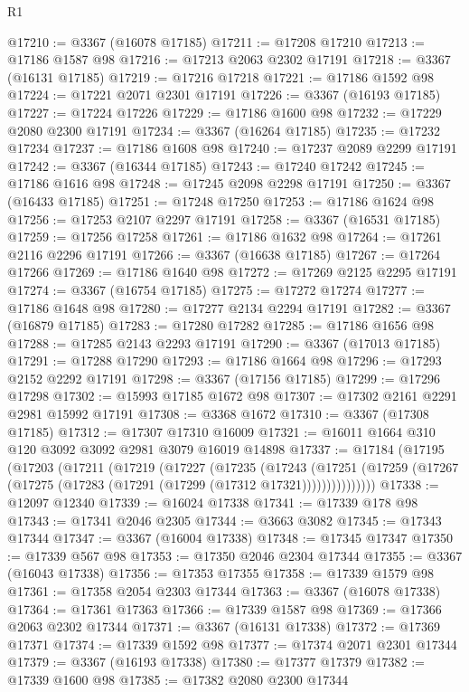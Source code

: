 \begin{lexlean}{R1}
\begin{coremodule}
@17210 := @3367 (@16078 @17185)
@17211 := @17208 @17210
@17213 := @17186 @1587 @98
@17216 := @17213 @2063 @2302 @17191
@17218 := @3367 (@16131 @17185)
@17219 := @17216 @17218
@17221 := @17186 @1592 @98
@17224 := @17221 @2071 @2301 @17191
@17226 := @3367 (@16193 @17185)
@17227 := @17224 @17226
@17229 := @17186 @1600 @98
@17232 := @17229 @2080 @2300 @17191
@17234 := @3367 (@16264 @17185)
@17235 := @17232 @17234
@17237 := @17186 @1608 @98
@17240 := @17237 @2089 @2299 @17191
@17242 := @3367 (@16344 @17185)
@17243 := @17240 @17242
@17245 := @17186 @1616 @98
@17248 := @17245 @2098 @2298 @17191
@17250 := @3367 (@16433 @17185)
@17251 := @17248 @17250
@17253 := @17186 @1624 @98
@17256 := @17253 @2107 @2297 @17191
@17258 := @3367 (@16531 @17185)
@17259 := @17256 @17258
@17261 := @17186 @1632 @98
@17264 := @17261 @2116 @2296 @17191
@17266 := @3367 (@16638 @17185)
@17267 := @17264 @17266
@17269 := @17186 @1640 @98
@17272 := @17269 @2125 @2295 @17191
@17274 := @3367 (@16754 @17185)
@17275 := @17272 @17274
@17277 := @17186 @1648 @98
@17280 := @17277 @2134 @2294 @17191
@17282 := @3367 (@16879 @17185)
@17283 := @17280 @17282
@17285 := @17186 @1656 @98
@17288 := @17285 @2143 @2293 @17191
@17290 := @3367 (@17013 @17185)
@17291 := @17288 @17290
@17293 := @17186 @1664 @98
@17296 := @17293 @2152 @2292 @17191
@17298 := @3367 (@17156 @17185)
@17299 := @17296 @17298
@17302 := @15993 @17185 @1672 @98
@17307 := @17302 @2161 @2291 @2981 @15992 @17191
@17308 := @3368 @1672
@17310 := @3367 (@17308 @17185)
@17312 := @17307 @17310 @16009
@17321 := @16011 @1664 @310 @120 @3092 @3092 @2981 @3079 @16019 @14898
@17337 := @17184
    (@17195
      (@17203
        (@17211
          (@17219
            (@17227
              (@17235
                (@17243
                  (@17251
                    (@17259 (@17267 (@17275 (@17283 (@17291 (@17299 (@17312 @17321)))))))))))))))
@17338 := @12097 @12340
@17339 := @16024 @17338
@17341 := @17339 @178 @98
@17343 := @17341 @2046 @2305
@17344 := @3663 @3082
@17345 := @17343 @17344
@17347 := @3367 (@16004 @17338)
@17348 := @17345 @17347
@17350 := @17339 @567 @98
@17353 := @17350 @2046 @2304 @17344
@17355 := @3367 (@16043 @17338)
@17356 := @17353 @17355
@17358 := @17339 @1579 @98
@17361 := @17358 @2054 @2303 @17344
@17363 := @3367 (@16078 @17338)
@17364 := @17361 @17363
@17366 := @17339 @1587 @98
@17369 := @17366 @2063 @2302 @17344
@17371 := @3367 (@16131 @17338)
@17372 := @17369 @17371
@17374 := @17339 @1592 @98
@17377 := @17374 @2071 @2301 @17344
@17379 := @3367 (@16193 @17338)
@17380 := @17377 @17379
@17382 := @17339 @1600 @98
@17385 := @17382 @2080 @2300 @17344

\end{coremodule}
\end{lexlean}
